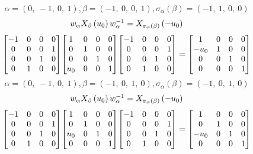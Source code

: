 \documentclass[11pt]{article}
\theoremstyle{definition}
\begin{document}
\[
\alpha = \left( 0, \  -1, \  0, \  1\right), \beta = \left( -1, \  0, \  0, \  1\right), \sigma_{\alpha}(\beta) = \left( -1, \  1, \  0, \  0\right)
\]
\[
\scaletoalign{\textwidth}{w_{\alpha} X_{\beta}\left(u_{0}\right) w_{\alpha}^{-1} = X_{\sigma_{\alpha}\left(\beta\right)}\left(- u_{0}\right)}
\]
\[
\scaletoalign{\textwidth}{{\left[\begin{matrix}-1 & 0 & 0 & 0\\0 & 0 & 0 & 1\\0 & 0 & 1 & 0\\0 & 1 & 0 & 0\end{matrix}\right]} {\left[\begin{matrix}1 & 0 & 0 & 0\\0 & 1 & 0 & 0\\0 & 0 & 1 & 0\\u_{0} & 0 & 0 & 1\end{matrix}\right]} {\left[\begin{matrix}-1 & 0 & 0 & 0\\0 & 0 & 0 & 1\\0 & 0 & 1 & 0\\0 & 1 & 0 & 0\end{matrix}\right]} = {\left[\begin{matrix}1 & 0 & 0 & 0\\- u_{0} & 1 & 0 & 0\\0 & 0 & 1 & 0\\0 & 0 & 0 & 1\end{matrix}\right]}}
\]
\[
\alpha = \left( 0, \  -1, \  0, \  1\right), \beta = \left( -1, \  0, \  1, \  0\right), \sigma_{\alpha}(\beta) = \left( -1, \  0, \  1, \  0\right)
\]
\[
\scaletoalign{\textwidth}{w_{\alpha} X_{\beta}\left(u_{0}\right) w_{\alpha}^{-1} = X_{\sigma_{\alpha}\left(\beta\right)}\left(- u_{0}\right)}
\]
\[
\scaletoalign{\textwidth}{{\left[\begin{matrix}-1 & 0 & 0 & 0\\0 & 0 & 0 & 1\\0 & 0 & 1 & 0\\0 & 1 & 0 & 0\end{matrix}\right]} {\left[\begin{matrix}1 & 0 & 0 & 0\\0 & 1 & 0 & 0\\u_{0} & 0 & 1 & 0\\0 & 0 & 0 & 1\end{matrix}\right]} {\left[\begin{matrix}-1 & 0 & 0 & 0\\0 & 0 & 0 & 1\\0 & 0 & 1 & 0\\0 & 1 & 0 & 0\end{matrix}\right]} = {\left[\begin{matrix}1 & 0 & 0 & 0\\0 & 1 & 0 & 0\\- u_{0} & 0 & 1 & 0\\0 & 0 & 0 & 1\end{matrix}\right]}}
\]
\end{document}
